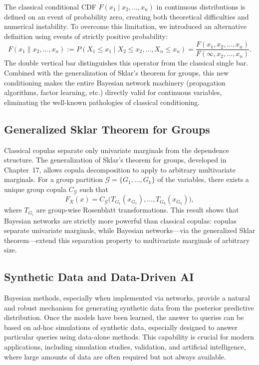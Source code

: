 The classical conditional CDF \(F(x_1\mid x_2,\dots,x_n)\) in continuous distributions is defined on an event of probability zero, creating both theoretical difficulties and numerical instability. To overcome this limitation, we introduced an alternative definition using events of strictly positive probability:
\[
F(x_1\|x_2,\dots,x_n) := P(X_1\le x_1\mid X_2\le x_2,\dots,X_n\le x_n) = \frac{F(x_1,x_2,\dots,x_n)}{F(\infty,x_2,\dots,x_n)}.
\]
The double vertical bar distinguishes this operator from the classical single bar. Combined with the generalization of Sklar's theorem for groups, this new conditioning makes the entire Bayesian network machinery (propagation algorithms, factor learning, etc.) directly valid for continuous variables, eliminating the well-known pathologies of classical conditioning.

\subsection{Generalized Sklar Theorem for Groups}

Classical copulas separate only univariate marginals from the dependence structure. The generalization of Sklar's theorem for groups, developed in Chapter~17, allows copula decomposition to apply to arbitrary multivariate marginals. For a group partition \(\mathcal{G} = \{G_1,\dots,G_k\}\) of the variables, there exists a unique group copula \(C_{\mathcal{G}}\) such that
\[
F_X(x) = C_{\mathcal{G}}\bigl(T_{G_1}(x_{G_1}),\dots,T_{G_k}(x_{G_k})\bigr),
\]
where \(T_{G_i}\) are group-wise Rosenblatt transformations. This result shows that Bayesian networks are strictly more powerful than classical copulas: copulas separate univariate marginals, while Bayesian networks—via the generalized Sklar theorem—extend this separation property to multivariate marginals of arbitrary size.

\subsection{Synthetic Data and Data-Driven AI}

Bayesian methods, especially when implemented via networks, provide a natural and robust mechanism for generating synthetic data from the posterior predictive distribution. Once the models have been learned, the answer to queries can be based on ad-hoc simulations of synthetic data, especially designed to answer particular queries using data-alone methods. This capability is crucial for modern applications, including simulation studies, validation, and artificial intelligence, where large amounts of data are often required but not always available.

